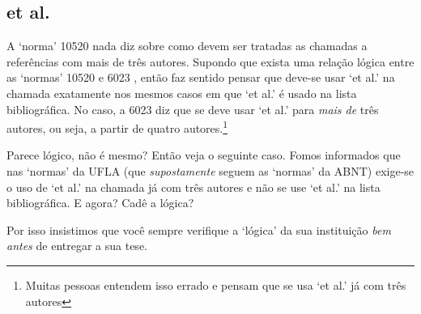 \documentclass[a4paper]{ltxdoc}
\begin{document}
\subsection{et al.}

A `norma' 10520 \cite{NBR10520:2001} nada diz sobre como devem ser tratadas as
chamadas a referências com mais de três autores. Supondo que exista uma relação
lógica entre as `normas' 10520 \cite{NBR10520:2001} e 6023 \cite{NBR6023:2000},
então faz sentido pensar que deve-se usar `et al.' na chamada exatamente nos
mesmos casos em que `et al.' é usado na lista bibliográfica. No caso, a 6023 diz
que se deve usar `et al.' para \emph{mais de} três autores, ou seja, a partir
de quatro autores.\footnote{Muitas pessoas entendem isso errado e pensam
que se usa `et al.' já com três autores}

Parece lógico, não é mesmo? Então veja o seguinte caso. Fomos informados que
nas `normas' da UFLA (que \emph{supostamente} seguem as `normas' da ABNT)
exige-se o uso de `et al.' na chamada já com três autores e não se use `et al.'
na lista bibliográfica. E agora? Cadê a lógica?

Por isso insistimos que você sempre verifique a `lógica' da sua instituição
\emph{bem antes} de entregar a sua tese.


%
\end{document}
